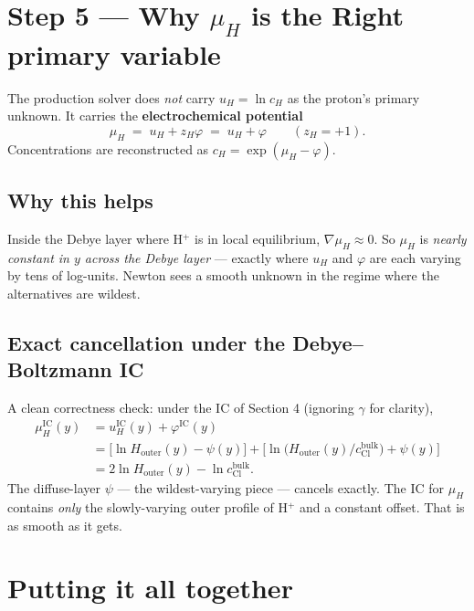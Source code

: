 \documentclass[11pt]{article}
\begin{document}
\section{Step 5 --- Why $\mu_H$ is the Right primary variable}

The production solver does \emph{not} carry $u_H = \ln c_H$ as the
proton's primary unknown. It carries the
\textbf{electrochemical potential}
\[
  \mu_H \;=\; u_H + z_H \varphi \;=\; u_H + \varphi
  \qquad (z_H = +1).
\]
Concentrations are reconstructed as $c_H = \exp(\mu_H - \varphi)$.

\subsection{Why this helps}

Inside the Debye layer where H$^+$ is in local equilibrium,
$\nabla \mu_H \approx 0$. So $\mu_H$ is \emph{nearly constant in $y$
across the Debye layer} --- exactly where $u_H$ and $\varphi$ are
each varying by tens of log-units. Newton sees a smooth unknown
in the regime where the alternatives are wildest.

\subsection{Exact cancellation under the Debye--Boltzmann IC}

A clean correctness check: under the IC of Section 4 (ignoring
$\gamma$ for clarity),
\begin{align*}
  \mu_H^{\mathrm{IC}}(y)
  &= u_H^{\mathrm{IC}}(y) + \varphi^{\mathrm{IC}}(y) \\
  &= \bigl[\ln H_{\mathrm{outer}}(y) - \psi(y)\bigr]
   + \bigl[\ln\bigl(H_{\mathrm{outer}}(y)/c_{\mathrm{Cl}}^{\mathrm{bulk}}\bigr) + \psi(y)\bigr]\\
  &= 2 \ln H_{\mathrm{outer}}(y) - \ln c_{\mathrm{Cl}}^{\mathrm{bulk}}.
\end{align*}
The diffuse-layer $\psi$ --- the wildest-varying piece --- cancels
exactly. The IC for $\mu_H$ contains \emph{only} the slowly-varying
outer profile of H$^+$ and a constant offset. That is as smooth as
it gets.

\section{Putting it all together}
\end{document}
